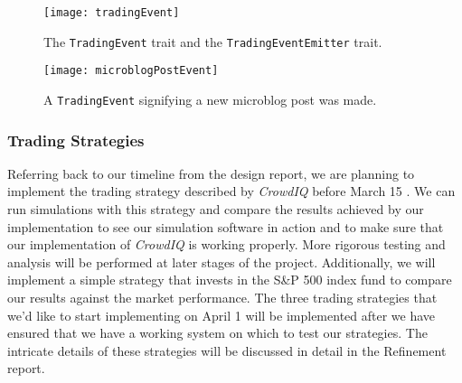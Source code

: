 \begin{figure}[h]
  \label{tradingEvent}
  \begin{center}
    \texttt{[image: tradingEvent]}
  \end{center}
  \caption{The \texttt{TradingEvent} trait and the \texttt{TradingEventEmitter} trait.}
\end{figure}

\begin{figure}[h]
  \label{microblogPostEvent}
  \begin{center}
    \texttt{[image: microblogPostEvent]}
  \end{center}
  \caption{A \texttt{TradingEvent} signifying a new microblog post was made.}
\end{figure}

\subsubsection{Trading Strategies}

Referring back to our timeline from the design report, we are planning to implement the trading strategy described by \textit{CrowdIQ} before March 15 \cite{crowdiq}.
We can run simulations with this strategy and compare the results achieved by our implementation to see our simulation software in action and to make sure that our implementation of \textit{CrowdIQ} is working properly.
More rigorous testing and analysis will be performed at later stages of the project.
Additionally, we will implement a simple strategy that invests in the S\&P 500 index fund to compare our results against the market performance.
The three trading strategies that we'd like to start implementing on April 1 will be implemented after we have ensured that we have a working system on which to test our strategies.
The intricate details of these strategies will be discussed in detail in the Refinement report.


